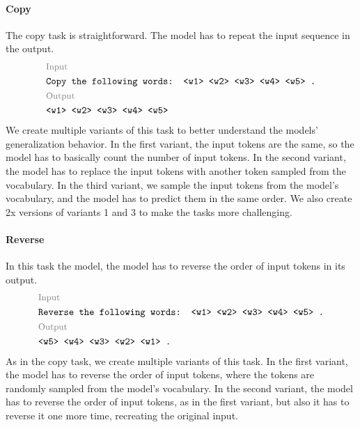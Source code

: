 \documentclass{article}
\begin{document}
\paragraph{Copy}
The copy task is straightforward. The model has to repeat the input sequence in the output.
\[
  \begin{aligned}
     & \text{\footnotesize \color{gray} Input}          \\
     & \texttt{Copy the following words: <w1> <w2> <w3> <w4> <w5> .} \\
     & \text{\footnotesize \color{gray} Output}         \\
     & \texttt{<w1> <w2> <w3> <w4> <w5>}                        \\
  \end{aligned}
\]
We create multiple variants of this task to better understand the models' generalization behavior.
In the first variant, the input tokens are the same, so the model has to basically count the number of input tokens. In the second variant, the model has to replace the input tokens with another token sampled from the vocabulary. In the third variant, we sample the input tokens from the model's vocabulary, and the model has to predict them in the same order. We also create 2x versions of variants 1 and 3 to make the tasks more challenging.

\paragraph{Reverse}
In this task the model, the model has to reverse the order of input tokens in its output.
\[
  \begin{aligned}
     & \text{\footnotesize \color{gray} Input}          \\
     & \texttt{Reverse the following words: <w1> <w2> <w3> <w4> <w5> .} \\
     & \text{\footnotesize \color{gray} Output}         \\
     & \texttt{<w5> <w4> <w3> <w2> <w1> .}                        \\
  \end{aligned}
\]
As in the copy task, we create multiple variants of this task. In the first variant, the model has to reverse the order of input tokens, where the tokens are randomly sampled from the model's vocabulary. In the second variant, the model has to reverse the order of input tokens, as in the first variant, but also it has to reverse it one more time, recreating the original input.
\end{document}
